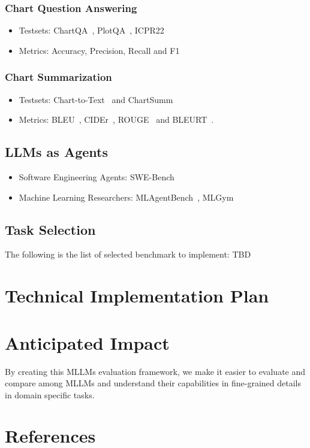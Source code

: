 \documentclass[
	letterpaper, %
]{jdf}
\begin{document}
\subsubsection{Chart Question Answering}
\begin{itemize}
    \item Testsets: ChartQA~\cite{masry2022chartqa}, PlotQA~\cite{methani2020plotqa}, ICPR22
         \item Metrics: Accuracy, Precision, Recall and F1
              \end{itemize}
\subsubsection{Chart Summarization}
\begin{itemize}
    \item Testsets: Chart-to-Text~\cite{kantharaj2022chart} and ChartSumm~\cite{rahman2023chartsumm}
    \item Metrics: BLEU~\cite{post2018call}, CIDEr~\cite{vedantam2015cider}, ROUGE~\cite{lin2004rouge} and BLEURT~\cite{sellam2020bleurt}.
              \end{itemize}
\subsection{LLMs as Agents}
\begin{itemize}
    \item Software Engineering Agents: SWE-Bench~\cite{yang2024swe}
    \item Machine Learning Researchers: MLAgentBench~\cite{huang2023mlagentbench}, MLGym~\cite{nathani2025mlgym}
              \end{itemize}
\subsection{Task Selection}
The following is the list of selected benchmark to implement: TBD
\section{Technical Implementation Plan}

\section{Anticipated Impact}\label{sect:impact}
By creating this MLLMs evaluation framework, we make it easier to evaluate and compare among MLLMs and understand their capabilities in fine-grained details in domain specific tasks.

\section{References}
\printbibliography[heading=none]
\end{document}
